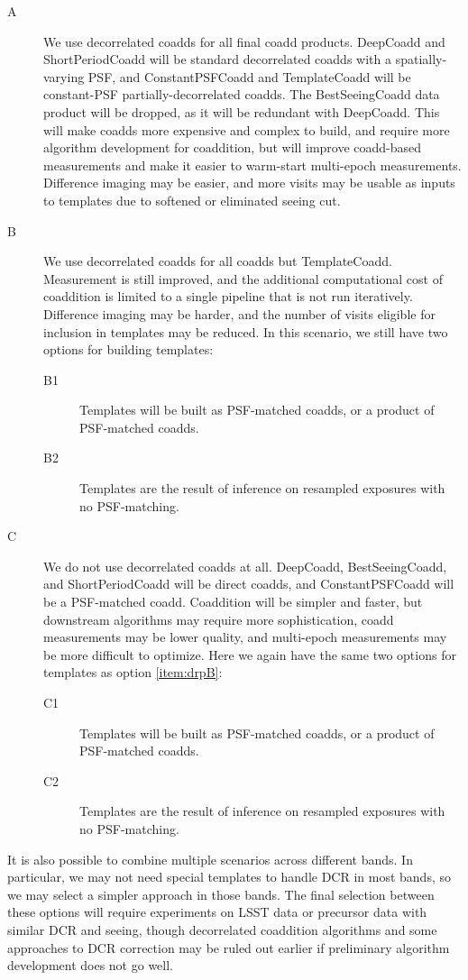 \begin{description}
  \item[A\label{item:drpA}] We use decorrelated coadds for all final coadd products.  DeepCoadd and ShortPeriodCoadd will be standard decorrelated coadds with a spatially-varying PSF, and ConstantPSFCoadd and TemplateCoadd will be constant-PSF partially-decorrelated coadds.  The BestSeeingCoadd data product will be dropped, as it will be redundant with DeepCoadd.  This will make coadds more expensive and complex to build, and require more algorithm development for coaddition, but will improve coadd-based measurements and make it easier to warm-start multi-epoch measurements.  Difference imaging may be easier, and more visits may be usable as inputs to templates due to softened or eliminated seeing cut.
  \item[B\label{item:drpB}] We use decorrelated coadds for all coadds but TemplateCoadd.  Measurement is still improved, and the additional computational cost of coaddition is limited to a single pipeline that is not run iteratively.  Difference imaging may be harder, and the number of visits eligible for inclusion in templates may be reduced.  In this scenario, we still have two options for building templates:
  \begin{description}
    \item[B1\label{item:drpB1}] Templates will be built as PSF-matched coadds, or a product of PSF-matched coadds.
    \item[B2\label{item:drpB2}] Templates are the result of inference on resampled exposures with no PSF-matching.
  \end{description}
  \item[C\label{item:drpC}] We do not use decorrelated coadds at all.  DeepCoadd, BestSeeingCoadd, and ShortPeriodCoadd will be direct coadds, and ConstantPSFCoadd will be a PSF-matched coadd.  Coaddition will be simpler and faster, but downstream algorithms may require more sophistication, coadd measurements may be lower quality, and multi-epoch measurements may be more difficult to optimize.  Here we again have the same two options for templates as option \ref{item:drpB}:
  \begin{description}
    \item[C1\label{item:drpC1}] Templates will be built as PSF-matched coadds, or a product of PSF-matched coadds.
    \item[C2\label{item:drpC2}] Templates are the result of inference on resampled exposures with no PSF-matching.
  \end{description}
\end{description}
It is also possible to combine multiple scenarios across different bands.  In particular, we may not need special templates to handle DCR in most bands, so we may select a simpler approach in those bands.  The final selection between these options will require experiments on LSST data or precursor data with similar DCR and seeing, though decorrelated coaddition algorithms and some approaches to DCR correction may be ruled out earlier if preliminary algorithm development does not go well.

